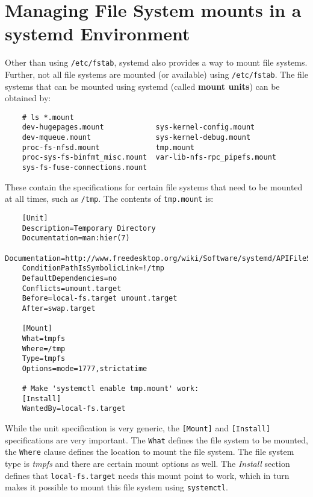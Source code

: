 
\usepackage{minted}
\usepackage{booktabs}


	
	
	\section{Managing File System mounts in a systemd Environment}
	Other than using \verb|/etc/fstab|, systemd also provides a way to mount file systems. Further, not all file systems are mounted (or available) using \verb|/etc/fstab|. The file systems that can be mounted using systemd (called \textbf{mount units}) can be obtained by:
	
	\vspace{-15pt}
	\begin{verbatim}
	# ls *.mount
	dev-hugepages.mount            sys-kernel-config.mount
	dev-mqueue.mount               sys-kernel-debug.mount
	proc-fs-nfsd.mount             tmp.mount
	proc-sys-fs-binfmt_misc.mount  var-lib-nfs-rpc_pipefs.mount
	sys-fs-fuse-connections.mount
	\end{verbatim}
	\vspace{-10pt}
	
	\noindent
	These contain the specifications for certain file systems that need to be mounted at all times, such as \verb|/tmp|. The contents of \verb|tmp.mount| is:
	
	\vspace{-15pt}
	\begin{verbatim}
	[Unit]
	Description=Temporary Directory
	Documentation=man:hier(7)
	Documentation=http://www.freedesktop.org/wiki/Software/systemd/APIFileSystems
	ConditionPathIsSymbolicLink=!/tmp
	DefaultDependencies=no
	Conflicts=umount.target
	Before=local-fs.target umount.target
	After=swap.target
	
	[Mount]
	What=tmpfs
	Where=/tmp
	Type=tmpfs
	Options=mode=1777,strictatime
	
	# Make 'systemctl enable tmp.mount' work:
	[Install]
	WantedBy=local-fs.target
	\end{verbatim}
	\vspace{-10pt}
	
	\noindent
	While the unit specification is very generic, the \verb|[Mount]| and \verb|[Install]| specifications are very important. The \verb|What| defines the file system to be mounted, the \verb|Where| clause defines the location to mount the file system. The file system type is \textit{tmpfs} and there are certain mount options as well. The \textit{Install} section defines that \verb|local-fs.target| needs this mount point to work, which in turn makes it possible to mount this file system using \verb|systemctl|.
	
